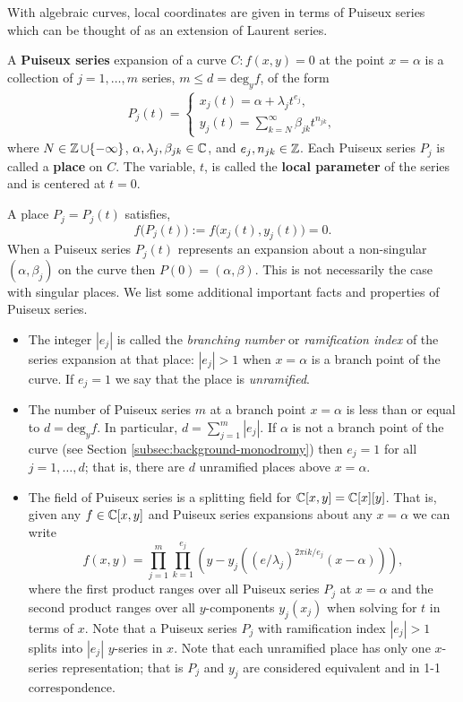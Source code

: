 With algebraic curves, local coordinates are given in terms of Puiseux series
which can be thought of as an extension of Laurent series.
\begin{definition} \label{def: puiseux} A {\bf Puiseux series} expansion of a
  curve $C : f(x,y) = 0$ at the point $x=\alpha$ is a collection of $j =
  1,\ldots,m$ series, $m \leq d = \text{deg}_y f$, of the form
  \begin{align*}
    P_j(t) =
    \begin{cases}
      x_j(t) = \alpha + \lambda_j t^{e_j}, \\
      y_j(t) = \sum_{k=N}^\infty \beta_{jk} t^{n_{jk}},
    \end{cases}
  \end{align*}
  where $N \in \operatorname{\mathbb{Z}} \cup \{-\infty\}$, $\alpha, \lambda_j, \beta_{jk} \in \operatorname{\mathbb{C}}$,
  and $e_j,n_{jk} \in \operatorname{\mathbb{Z}}$. Each Puiseux series $P_j$ is called a {\bf place} on
  $C$. The variable, $t$, is called the {\bf local parameter} of the series and
  is centered at $t=0$.
\end{definition}
A place $P_j = P_j(t)$ satisfies,
\[
    f\big(P_j(t)\big) := f\big(x_j(t), y_j(t)\big) = 0.
\]
When a Puiseux series $P_j(t)$ represents an expansion about a non-singular
$(\alpha, \beta_j)$ on the curve then $P(0) = (\alpha,\beta)$. This is not
necessarily the case with singular places. We list some additional important
facts and properties of Puiseux series.
\begin{itemize}
\item The integer $|e_j|$ is called the {\it branching number} or {\it
    ramification index} of the series expansion at that place: $|e_j| > 1$ when
  $x = \alpha$ is a branch point of the curve. If $e_j = 1$ we say that the
  place is {\it unramified}.
\item The number of Puiseux series $m$ at a branch point $x = \alpha$ is less
  than or equal to $d = \text{deg}_y f$. In particular, $d = \sum_{j=1}^m
  |e_j|$. If $\alpha$ is not a branch point of the curve (see Section
  \ref{subsec:background-monodromy}) then $e_j = 1$ for all $j = 1, \ldots, d$;
  that is, there are $d$ unramified places above $x = \alpha$.
\item The field of Puiseux series is a splitting field for $\operatorname{\mathbb{C}}[x,y] =
  \operatorname{\mathbb{C}}[x][y]$. That is, given any $f \in \operatorname{\mathbb{C}}[x,y]$ and Puiseux series expansions
  about any $x=\alpha$ we can write
  \[
    f(x,y) = \prod_{j=1}^m \prod_{k=1}^{e_j} \left( y - y_j\left(
             (e/\lambda_j)^{2 \pi ik / e_j}(x-\alpha) \right) \right),
  \]
  where the first product ranges over all Puiseux series $P_j$ at $x=\alpha$ and
  the second product ranges over all $y$-components $y_j(x_j)$ when solving for
  $t$ in terms of $x$. Note that a Puiseux series $P_j$ with ramification index
  $|e_j|>1$ splits into $|e_j|$ $y$-series in $x$. Note that each unramified
  place has only one $x$-series representation; that is $P_j$ and $y_j$ are
  considered equivalent and in 1-1 correspondence.
\end{itemize}

